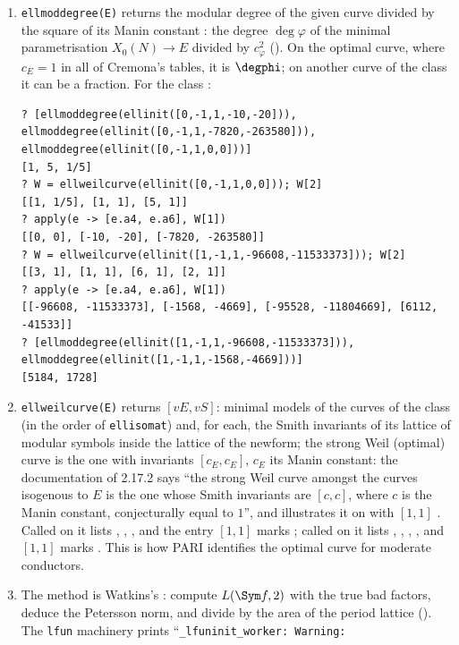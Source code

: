 \begin{sloppypar}
\begin{remark}\label{rem:computation:ellmoddegree}
\begin{enumerate}[label=(\roman*)]
\item \texttt{ellmoddegree(E)} returns the modular degree of the given curve divided by the square of its Manin constant \cite{PARIusers}: the
degree $\deg\varphi$ of the minimal parametrisation $X_0(N)\to E$ divided by $c_\varphi^2$ (). On the optimal curve, where
$c_E=1$ in all of Cremona's tables, it is $\degphi$; on another curve of the class it can be a fraction. For the class :
\begin{lstlisting}[language=GP]
? [ellmoddegree(ellinit([0,-1,1,-10,-20])), ellmoddegree(ellinit([0,-1,1,-7820,-263580])), ellmoddegree(ellinit([0,-1,1,0,0]))]
[1, 5, 1/5]
? W = ellweilcurve(ellinit([0,-1,1,0,0])); W[2]
[[1, 1/5], [1, 1], [5, 1]]
? apply(e -> [e.a4, e.a6], W[1])
[[0, 0], [-10, -20], [-7820, -263580]]
? W = ellweilcurve(ellinit([1,-1,1,-96608,-11533373])); W[2]
[[3, 1], [1, 1], [6, 1], [2, 1]]
? apply(e -> [e.a4, e.a6], W[1])
[[-96608, -11533373], [-1568, -4669], [-95528, -11804669], [6112, -41533]]
? [ellmoddegree(ellinit([1,-1,1,-96608,-11533373])), ellmoddegree(ellinit([1,-1,1,-1568,-4669]))]
[5184, 1728]
\end{lstlisting}
\item \texttt{ellweilcurve(E)} returns $[vE,vS]$: minimal models of the curves of the class (in the order of \texttt{ellisomat}) and, for each,
the Smith invariants of its lattice of modular symbols inside the lattice of the newform; the strong Weil (optimal) curve is the one with
invariants $[c_E,c_E]$, $c_E$ its Manin constant: the documentation of 2.17.2 says ``the strong Weil curve amongst the curves isogenous to $E$ is the one
whose Smith invariants are $[c,c]$, where $c$ is the Manin constant, conjecturally equal to $1$'', and illustrates it on  with $[1,1]$
\cite{PARIusers}. Called on  it lists , , , and the entry
$[1,1]$ marks ; called on  it lists , , , , and $[1,1]$ marks . This is how PARI
identifies the optimal curve for moderate conductors.
\item The method is Watkins's \cite{Watkins02}: compute $L(\Sym f,2)$ with the true bad factors, deduce the Petersson norm, and divide by the
area of the period lattice (). The \texttt{lfun} machinery prints ``\texttt{\_lfuninit\_worker: Warning:
}
\end{enumerate}
\end{remark}
\end{sloppypar}
